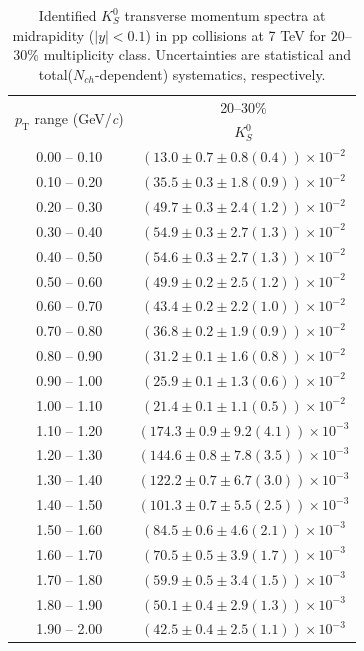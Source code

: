 \begin{table}
\caption{Identified $K^{0}_{S}$ transverse momentum spectra at midrapidity ($|y|<0.1$) in pp collisions at 7 TeV for 20--30\% multiplicity class. Uncertainties are statistical and total($N_{ch}$-dependent) systematics, respectively.}
\label{tab:K0Short_20to30}
\begin{center}
\begin{tabular}{ c | c }
\hline
\multirow{2}{*}{$p_{\mathrm{T}}$ range (GeV/\textit{c})} & \multicolumn{1}{c}{20--30\%} \\ & $K^{0}_{S}$\\ 
\hline
0.00 -- 0.10 & $(13.0\pm0.7\pm0.8(0.4))\times10^{-2}$ \\ 
0.10 -- 0.20 & $(35.5\pm0.3\pm1.8(0.9))\times10^{-2}$ \\ 
0.20 -- 0.30 & $(49.7\pm0.3\pm2.4(1.2))\times10^{-2}$ \\ 
0.30 -- 0.40 & $(54.9\pm0.3\pm2.7(1.3))\times10^{-2}$ \\ 
0.40 -- 0.50 & $(54.6\pm0.3\pm2.7(1.3))\times10^{-2}$ \\ 
0.50 -- 0.60 & $(49.9\pm0.2\pm2.5(1.2))\times10^{-2}$ \\ 
0.60 -- 0.70 & $(43.4\pm0.2\pm2.2(1.0))\times10^{-2}$ \\ 
0.70 -- 0.80 & $(36.8\pm0.2\pm1.9(0.9))\times10^{-2}$ \\ 
0.80 -- 0.90 & $(31.2\pm0.1\pm1.6(0.8))\times10^{-2}$ \\ 
0.90 -- 1.00 & $(25.9\pm0.1\pm1.3(0.6))\times10^{-2}$ \\ 
1.00 -- 1.10 & $(21.4\pm0.1\pm1.1(0.5))\times10^{-2}$ \\ 
1.10 -- 1.20 & $(174.3\pm0.9\pm9.2(4.1))\times10^{-3}$ \\ 
1.20 -- 1.30 & $(144.6\pm0.8\pm7.8(3.5))\times10^{-3}$ \\ 
1.30 -- 1.40 & $(122.2\pm0.7\pm6.7(3.0))\times10^{-3}$ \\ 
1.40 -- 1.50 & $(101.3\pm0.7\pm5.5(2.5))\times10^{-3}$ \\ 
1.50 -- 1.60 & $(84.5\pm0.6\pm4.6(2.1))\times10^{-3}$ \\ 
1.60 -- 1.70 & $(70.5\pm0.5\pm3.9(1.7))\times10^{-3}$ \\ 
1.70 -- 1.80 & $(59.9\pm0.5\pm3.4(1.5))\times10^{-3}$ \\ 
1.80 -- 1.90 & $(50.1\pm0.4\pm2.9(1.3))\times10^{-3}$ \\ 
1.90 -- 2.00 & $(42.5\pm0.4\pm2.5(1.1))\times10^{-3}$ \\ 

\end{tabular}
\end{center}
\end{table}

